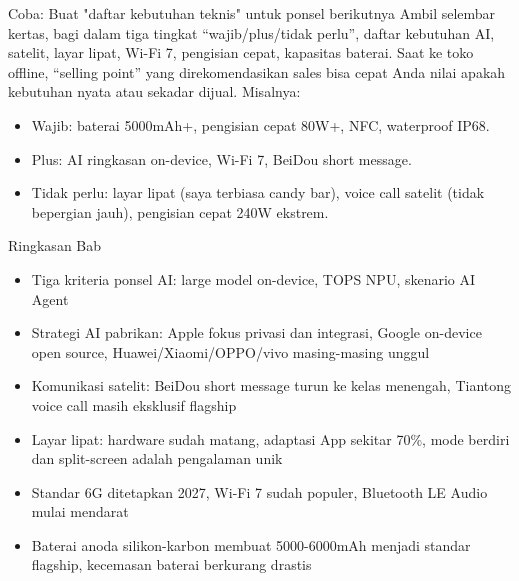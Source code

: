 \begin{tcbpractice}{Coba: Buat "daftar kebutuhan teknis" untuk ponsel berikutnya}
Ambil selembar kertas, bagi dalam tiga tingkat “wajib/plus/tidak perlu”, daftar kebutuhan AI, satelit, layar lipat, Wi-Fi 7, pengisian cepat, kapasitas baterai. Saat ke toko offline, “selling point” yang direkomendasikan sales bisa cepat Anda nilai apakah kebutuhan nyata atau sekadar dijual. Misalnya:

\begin{itemize}
  \item Wajib: baterai 5000mAh+, pengisian cepat 80W+, NFC, waterproof IP68.
  \item Plus: AI ringkasan on-device, Wi-Fi 7, BeiDou short message.
  \item Tidak perlu: layar lipat (saya terbiasa candy bar), voice call satelit (tidak bepergian jauh), pengisian cepat 240W ekstrem.
\end{itemize}

\end{tcbpractice}

\begin{tcbsummary}{Ringkasan Bab}
\begin{itemize}
  \item Tiga kriteria ponsel AI: large model on-device, TOPS NPU, skenario AI Agent
  \item Strategi AI pabrikan: Apple fokus privasi dan integrasi, Google on-device open source, Huawei/Xiaomi/OPPO/vivo masing-masing unggul
  \item Komunikasi satelit: BeiDou short message turun ke kelas menengah, Tiantong voice call masih eksklusif flagship
  \item Layar lipat: hardware sudah matang, adaptasi App sekitar 70\%, mode berdiri dan split-screen adalah pengalaman unik
  \item Standar 6G ditetapkan 2027, Wi-Fi 7 sudah populer, Bluetooth LE Audio mulai mendarat
  \item Baterai anoda silikon-karbon membuat 5000-6000mAh menjadi standar flagship, kecemasan baterai berkurang drastis
\end{itemize}

\end{tcbsummary}
